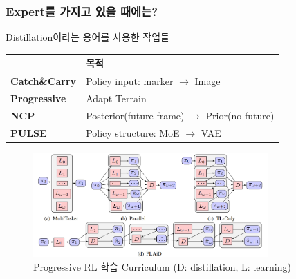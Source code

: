 \documentclass[11pt,xcolor={dvipsnames},hyperref={pdftex,pdfpagemode=UseNone,hidelinks,pdfdisplaydoctitle=true},usepdftitle=false]{beamer}
\begin{document}
\begin{frame}
    \frametitle{Expert를 가지고 있을 때에는?}
    Distillation이라는 용어를 사용한 작업들

    \begin{table}
        \centering
        \begin{tabular}{|>{\small}l|>{\small}l|}
            \hline
            \rowcolor{lightgray} %
            & \textbf{목적} \\
            \hline
            \textbf{Catch\&Carry} & Policy input: \: marker $\to$ Image \\
            \hline
            \textbf{Progressive} & Adapt Terrain \\
            \hline
            \textbf{NCP} & Posterior(future frame) $\to$ Prior(no future) \\
            \hline
            \textbf{PULSE} & Policy structure: \: MoE $\to$ VAE \\
            \hline
        \end{tabular}
    \end{table}    

    \begin{figure}
        \centering
        \includegraphics[width=0.8\textwidth]{figs/progressive.png}
        \caption{Progressive RL 학습 Curriculum {\footnotesize (D: distillation, L: learning)}}
    \end{figure}    
\end{frame}
\end{document}
